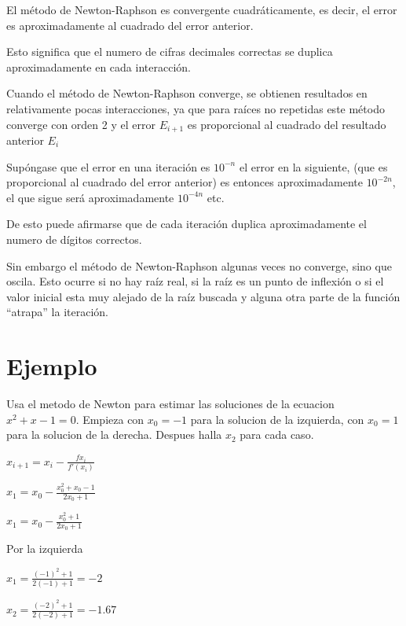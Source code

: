 \documentclass{article}
\begin{document}
\begin{multicols}{2}
El método de Newton-Raphson es convergente cuadráticamente, es decir, el error es aproximadamente al cuadrado del error anterior.

Esto significa que el numero de cifras decimales correctas se duplica aproximadamente en cada interacción.

Cuando el método de Newton-Raphson converge, se obtienen resultados en relativamente pocas interacciones, ya que para raíces no repetidas este método converge con orden 2 y el error $E_{i+1}$ es proporcional al cuadrado del resultado anterior $E_{i}$

Supóngase que el error en una iteración es $10^{-n}$ el error en la siguiente, (que es proporcional al cuadrado del  error anterior) es entonces aproximadamente $10^{-2n}$, el que sigue será aproximadamente $10^{-4n}$ etc.

De esto puede afirmarse que de cada iteración duplica aproximadamente el numero de dígitos correctos.

Sin embargo el método de Newton-Raphson algunas veces no converge, sino que oscila. Esto ocurre si no hay raíz real, si la raíz es un punto de inflexión o si el valor inicial esta muy alejado de la raíz buscada  y alguna otra parte de la función “atrapa” la iteración.

\section{Ejemplo}
\label{sec:Ejem}
Usa el metodo de Newton para estimar las soluciones de la ecuacion $x^{2}+x-1=0$. Empieza con $x_{0}=-1$ para la solucion de la izquierda, con $x_{0}=1$ para la solucion de la derecha. Despues halla $x_{2}$ para cada caso.

\begin{center}
$x_{i+1}=x_{i}-\frac{fx_{i}}{f'(x_{i})}$
\end{center}

\begin{center}
$x_{1}=x_{0}-\frac{x^{2}_{0}+x_{0}-1}{2x_{0}+1}$
\end{center}

\begin{center}
$x_{1}=x_{0}-\frac{x^{2}_{0}+1}{2x_{0}+1}$
\end{center}

Por la izquierda
\begin{center}
$x_{1}=\frac{(-1)^{2}+1}{2(-1)+1} = -2$
\end{center}

\begin{center}
$x_{2}=\frac{(-2)^{2}+1}{2(-2)+1} = -1.67$
\end{center}


\end{multicols}
\end{document}
